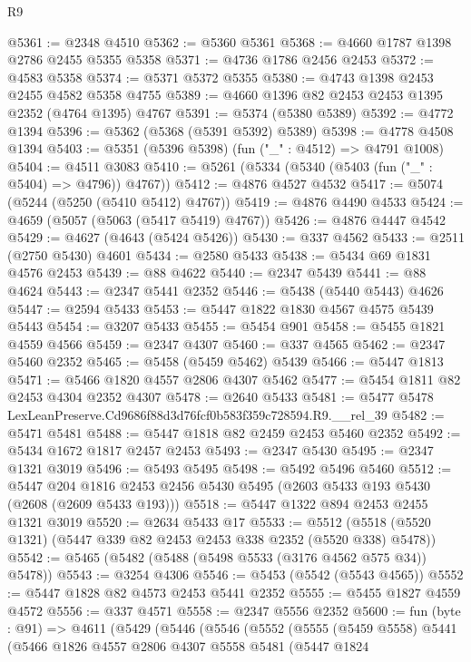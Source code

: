\begin{lexlean}{R9}
\begin{coremodule}
@5361 := @2348 @4510
@5362 := @5360 @5361
@5368 := @4660 @1787 @1398 @2786 @2455 @5355 @5358
@5371 := @4736 @1786 @2456 @2453
@5372 := @4583 @5358
@5374 := @5371 @5372 @5355
@5380 := @4743 @1398 @2453 @2455 @4582 @5358 @4755
@5389 := @4660 @1396 @82 @2453 @2453 @1395 @2352 (@4764 @1395) @4767
@5391 := @5374 (@5380 @5389)
@5392 := @4772 @1394
@5396 := @5362 (@5368 (@5391 @5392) @5389)
@5398 := @4778 @4508 @1394
@5403 := @5351 (@5396 @5398) (fun ("_" : @4512) => @4791 @1008)
@5404 := @4511 @3083
@5410 := @5261 (@5334 (@5340 (@5403 (fun ("_" : @5404) => @4796)) @4767))
@5412 := @4876 @4527 @4532
@5417 := @5074 (@5244 (@5250 (@5410 @5412) @4767))
@5419 := @4876 @4490 @4533
@5424 := @4659 (@5057 (@5063 (@5417 @5419) @4767))
@5426 := @4876 @4447 @4542
@5429 := @4627 (@4643 (@5424 @5426))
@5430 := @337 @4562
@5433 := @2511 (@2750 @5430) @4601
@5434 := @2580 @5433
@5438 := @5434 @69 @1831 @4576 @2453
@5439 := @88 @4622
@5440 := @2347 @5439
@5441 := @88 @4624
@5443 := @2347 @5441 @2352
@5446 := @5438 (@5440 @5443) @4626
@5447 := @2594 @5433
@5453 := @5447 @1822 @1830 @4567 @4575 @5439 @5443
@5454 := @3207 @5433
@5455 := @5454 @901
@5458 := @5455 @1821 @4559 @4566
@5459 := @2347 @4307
@5460 := @337 @4565
@5462 := @2347 @5460 @2352
@5465 := @5458 (@5459 @5462) @5439
@5466 := @5447 @1813
@5471 := @5466 @1820 @4557 @2806 @4307 @5462
@5477 := @5454 @1811 @82 @2453 @4304 @2352 @4307
@5478 := @2640 @5433
@5481 := @5477 @5478 LexLeanPreserve.Cd9686f88d3d76fcf0b583f359c728594.R9.__rel_39
@5482 := @5471 @5481
@5488 := @5447 @1818 @82 @2459 @2453 @5460 @2352
@5492 := @5434 @1672 @1817 @2457 @2453
@5493 := @2347 @5430
@5495 := @2347 @1321 @3019
@5496 := @5493 @5495
@5498 := @5492 @5496 @5460
@5512 := @5447
    @204
    @1816
    @2453
    @2456
    @5430
    @5495
    (@2603 @5433 @193 @5430 (@2608 (@2609 @5433 @193)))
@5518 := @5447 @1322 @894 @2453 @2455 @1321 @3019
@5520 := @2634 @5433 @17
@5533 := @5512 (@5518 (@5520 @1321) (@5447 @339 @82 @2453 @2453 @338 @2352 (@5520 @338) @5478))
@5542 := @5465 (@5482 (@5488 (@5498 @5533 (@3176 @4562 @575 @34)) @5478))
@5543 := @3254 @4306
@5546 := @5453 (@5542 (@5543 @4565))
@5552 := @5447 @1828 @82 @4573 @2453 @5441 @2352
@5555 := @5455 @1827 @4559 @4572
@5556 := @337 @4571
@5558 := @2347 @5556 @2352
@5600 := fun (byte : @91) =>
  @4611
    (@5429
      (@5446
        (@5546
          (@5552
            (@5555
              (@5459 @5558)
              @5441
              (@5466
                @1826
                @4557
                @2806
                @4307
                @5558
                @5481
                (@5447
                  @1824

\end{coremodule}
\end{lexlean}
